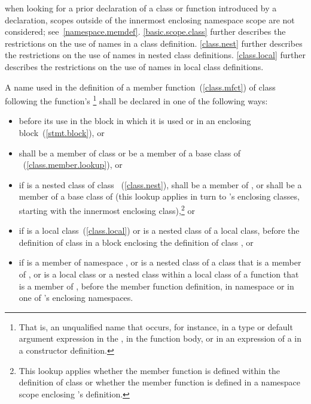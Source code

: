 \exitexampleb \enternote when looking for a prior declaration of a class
or function introduced by a  declaration, scopes outside
of the innermost enclosing namespace scope are not considered;
see~\ref{namespace.memdef}. \exitnote \enternote \ref{basic.scope.class}
further describes the restrictions on the use of names in a class
definition. \ref{class.nest} further describes the restrictions on the
use of names in nested class definitions. \ref{class.local} further
describes the restrictions on the use of names in local class
definitions. \exitnote

\pnum
A name used in the definition of a member function~(\ref{class.mfct}) of
class  following the function's
\footnote{That is, an unqualified name that occurs,
for instance, in a type or default argument expression in the
, in the function body, or in an
expression of a  in a constructor definition.}
shall be declared in one of the following ways:

\begin{itemize}
\item before its use in the block in which it is used or in an enclosing
block~(\ref{stmt.block}), or

\item shall be a member of class  or be a member of a base
class of ~(\ref{class.member.lookup}), or

\item if 
is a nested class of class ~(\ref{class.nest}), shall be a
member of , or shall be a member of a base class of 
(this lookup applies in turn to 's enclosing classes, starting
with the innermost enclosing class),\footnote{This lookup applies whether
the member function is defined
within the definition of class  or whether the member function
is defined in a namespace scope enclosing 's definition.}
or

\item if  is a local class~(\ref{class.local}) or is a nested
class of a local class, before the definition of class  in a
block enclosing the definition of class , or

\item if  is a member of namespace , or is a nested
class of a class that is a member of , or is a local class or a
nested class within a local class of a function that is a member of
, before the member function definition, in namespace 
or in one of  's enclosing namespaces.
\end{itemize}


